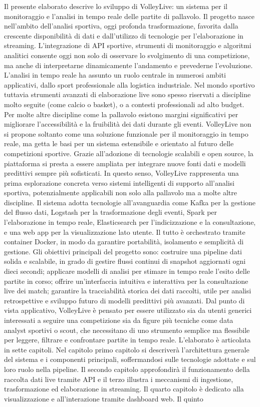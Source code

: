 \documentclass[a4paper,12pt]{report}
\begin{document}
Il presente elaborato descrive lo sviluppo di VolleyLive: un sistema per il monitoraggio e l’analisi in tempo reale delle partite di pallavolo. Il progetto nasce nell’ambito dell’analisi sportiva, oggi profonda trasformazione, favorita dalla crescente disponibilità di dati e dall’utilizzo di tecnologie per l’elaborazione in streaming. L’integrazione di API sportive, strumenti di monitoraggio e algoritmi analitici consente oggi non solo di osservare lo svolgimento di una competizione, ma anche di interpretarne dinamicamente l’andamento e prevederne l’evoluzione. L’analisi in tempo reale ha assunto un ruolo centrale in numerosi ambiti applicativi, dallo sport professionale alla logistica industriale. Nel mondo sportivo tuttavia strumenti avanzati di elaborazione live sono spesso riservati a discipline molto seguite (come calcio o basket), o a contesti professionali ad alto budget. Per molte altre discipline come la pallavolo esistono margini significativi per migliorare l’accessibilità e la fruibilità dei dati durante gli eventi. VolleyLive non si propone soltanto come una soluzione funzionale per il monitoraggio in tempo reale, ma getta le basi per un sistema estensibile e orientato al futuro delle competizioni sportive. Grazie all’adozione di tecnologie scalabili e open source, la piattaforma si presta a essere ampliata per integrare nuove fonti dati e modelli predittivi sempre più sofisticati. In questo senso, VolleyLive rappresenta una prima esplorazione concreta verso sistemi intelligenti di supporto all’analisi sportiva, potenzialmente applicabili non solo alla pallavolo ma a molte altre discipline. Il sistema adotta tecnologie all'avanguardia come Kafka per la gestione del flusso dati, Logstash per la trasformazione degli eventi, Spark per l’elaborazione in tempo reale, Elasticsearch per l’indicizzazione e la consultazione, e una web app per la visualizzazione lato utente. Il tutto è orchestrato tramite container Docker, in modo da garantire portabilità, isolamento e semplicità di gestione. Gli obiettivi principali del progetto sono: costruire una pipeline dati solida e scalabile, in grado di gestire flussi continui di snapshot aggiornati ogni dieci secondi; applicare modelli di analisi per stimare in tempo reale l’esito delle partite in corso; offrire un’interfaccia intuitiva e interattiva per la consultazione live dei match; garantire la tracciabilità storica dei dati raccolti, utile per analisi retrospettive e sviluppo futuro di modelli predittivi più avanzati. Dal punto di vista applicativo, VolleyLive è pensato per essere utilizzato sia da utenti generici interessati a seguire una competizione sia da figure più tecniche come data analyst sportivi o scout, che necessitano di uno strumento semplice ma flessibile per leggere, filtrare e confrontare partite in tempo reale. L'elaborato è articolata in sette capitoli. Nel capitolo primo capitolo si descriverà l’architettura generale del sistema e i componenti principali, soffermandosi sulle tecnologie adottate e sul loro ruolo nella pipeline. Il secondo capitolo approfondirà il funzionamento della raccolta dati live tramite API e il terzo illustra i meccanismi di ingestione, trasformazione ed elaborazione in streaming. Il quarto capitolo è dedicato alla visualizzazione e all’interazione tramite dashboard web. Il quinto 
\end{document}
